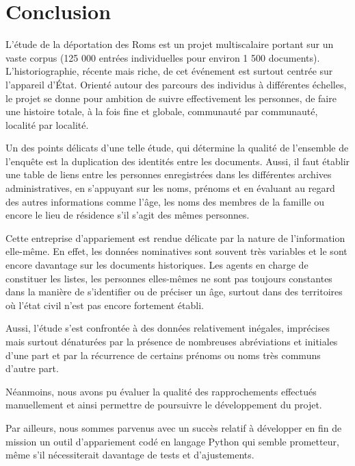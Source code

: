 \documentclass[a4paper,12pt,twoside]{book}
\begin{document}
	\pagestyle{empty}
	\cleardoublepage
	\pagestyle{plain}			
		
		
	\chapter*{Conclusion}
		
		L'étude de la déportation des Roms est un projet multiscalaire portant sur un vaste corpus (125 000 entrées individuelles pour environ 1 500 documents). L'historiographie, récente mais riche, de cet événement est surtout centrée sur l'appareil d'État. Orienté autour des parcours des individus à différentes échelles, le projet se donne pour ambition de suivre effectivement les personnes, de faire une histoire totale, à la fois fine et globale, communauté par communauté, localité par localité.
		
		Un des points délicats d'une telle étude, qui détermine la qualité de l’ensemble de l’enquête est la duplication des identités entre les documents. Aussi, il faut établir une table de liens entre les personnes enregistrées dans les différentes archives administratives, en s'appuyant sur les noms, prénoms et en évaluant au regard des autres informations comme l’âge, les noms des membres de la famille ou encore le lieu de résidence s’il s’agit des mêmes personnes.
		
		Cette entreprise d'appariement est rendue délicate par la nature de l'information elle-même. En effet, les données nominatives sont souvent très variables et le sont encore davantage sur les documents historiques. Les agents en charge de constituer les listes, les personnes elles-mêmes ne sont pas toujours constantes dans la manière de s'identifier ou de préciser un âge, surtout dans des territoires où l'état civil n'est pas encore fortement établi.
		
		Aussi, l'étude s'est confrontée à des données relativement inégales, imprécises mais surtout dénaturées par la présence de nombreuses abréviations et initiales d'une part et par la récurrence de certains prénoms ou noms très communs d'autre part.
		
		Néanmoins, nous avons pu évaluer la qualité des rapprochements effectués manuellement et ainsi permettre de poursuivre le développement du projet.
		
		Par ailleurs, nous sommes parvenus avec un succès relatif à développer en fin de mission un outil d'appariement codé en langage Python qui semble prometteur, même s'il nécessiterait davantage de tests et d'ajustements.
		
\end{document}
